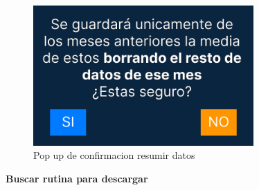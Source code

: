 \begin{figure}[H]
   \centering
    \includegraphics[width=0.75\textwidth]{fotos/Frame 39.png}
    \caption{Pop up de confirmacion resumir datos}
    \label{fig:Pop up de confirmacion resumir datos}
\end{figure}

\textbf{Buscar rutina para descargar}

